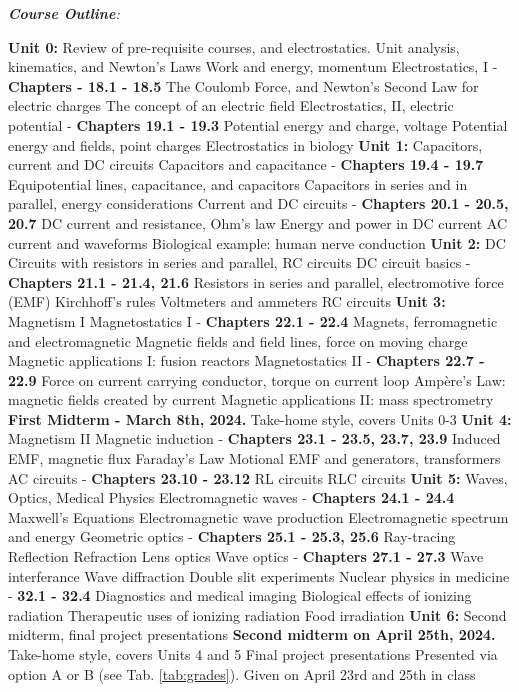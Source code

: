 \documentclass[10pt]{article}
\begin{document}
\clearpage
\twocolumn
\textit{\textbf{Course Outline}:}
\begin{outline}[enumerate]
\1 \textbf{Unit 0:} Review of pre-requisite courses, and electrostatics.
\2 Unit analysis, kinematics, and Newton's Laws
\2 Work and energy, momentum
\2 Electrostatics, I - \textbf{Chapters - 18.1 - 18.5}
\3 The Coulomb Force, and Newton's Second Law for electric charges
\3 The concept of an electric field
\2 Electrostatics, II, electric potential - \textbf{Chapters 19.1 - 19.3}
\3 Potential energy and charge, voltage
\3 Potential energy and fields, point charges
\3 Electrostatics in biology
\1 \textbf{Unit 1:} Capacitors, current and DC circuits
\2 Capacitors and capacitance - \textbf{Chapters 19.4 - 19.7}
\3 Equipotential lines, capacitance, and capacitors
\3 Capacitors in series and in parallel, energy considerations
\2 Current and DC circuits - \textbf{Chapters 20.1 - 20.5, 20.7}
\3 DC current and resistance, Ohm's law
\3 Energy and power in DC current
\3 AC current and waveforms
\3 Biological example: human nerve conduction
\1 \textbf{Unit 2:} DC Circuits with resistors in series and parallel, RC circuits
\2 DC circuit basics - \textbf{Chapters 21.1 - 21.4, 21.6}
\3 Resistors in series and parallel, electromotive force (EMF)
\3 Kirchhoff's rules
\3 Voltmeters and ammeters
\3 RC circuits
\1 \textbf{Unit 3:} Magnetism I
\2 Magnetostatics I - \textbf{Chapters 22.1 - 22.4}
\3 Magnets, ferromagnetic and electromagnetic
\3 Magnetic fields and field lines, force on moving charge
\3 Magnetic applications I: fusion reactors
\2 Magnetostatics II - \textbf{Chapters 22.7 - 22.9}
\3 Force on current carrying conductor, torque on current loop
\3 Amp\`{e}re's Law: magnetic fields created by current
\3 Magnetic applications II: mass spectrometry
\1 \textbf{First Midterm - March 8th, 2024.}
\2 Take-home style, covers Units 0-3
\1 \textbf{Unit 4:} Magnetism II
\2 Magnetic induction - \textbf{Chapters 23.1 - 23.5, 23.7, 23.9}
\3 Induced EMF, magnetic flux
\3 Faraday's Law
\3 Motional EMF and generators, transformers
\2 AC circuits - \textbf{Chapters 23.10 - 23.12}
\3 RL circuits
\3 RLC circuits
\1 \textbf{Unit 5:} Waves, Optics, Medical Physics
\2 Electromagnetic waves - \textbf{Chapters 24.1 - 24.4}
\3 Maxwell's Equations
\3 Electromagnetic wave production
\3 Electromagnetic spectrum and energy
\2 Geometric optics - \textbf{Chapters 25.1 - 25.3, 25.6}
\3 Ray-tracing
\3 Reflection
\3 Refraction
\3 Lens optics
\2 Wave optics - \textbf{Chapters 27.1 - 27.3}
\3 Wave interferance
\3 Wave diffraction
\3 Double slit experiments
\2 Nuclear physics in medicine - \textbf{32.1 - 32.4}
\3 Diagnostics and medical imaging
\3 Biological effects of ionizing radiation
\3 Therapeutic uses of ionizing radiation
\3 Food irradiation
\1 \textbf{Unit 6:} Second midterm, final project presentations
\2 \textbf{Second midterm on April 25th, 2024.}
\3 Take-home style, covers Units 4 and 5
\2 Final project presentations
\3 Presented via option A or B (see Tab. \ref{tab:grades}).
\3 Given on April 23rd and 25th in class
\end{outline}
\end{document}
